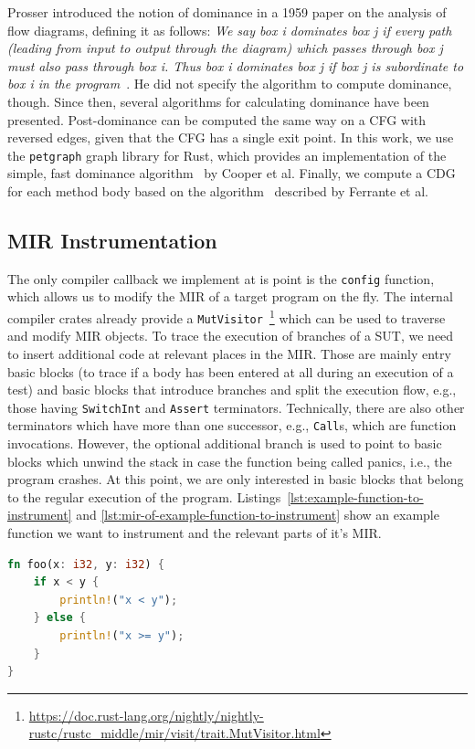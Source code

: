 \documentclass{article}
\begin{document}
Prosser introduced the notion of dominance in a 1959 paper on the analysis of flow diagrams, defining it as follows:
\textit{We say box i dominates box j if every path (leading from input to output through the diagram) which passes through box j must also pass through box i. Thus box i dominates box j if box j is subordinate to box i in the program}~\cite{Prosser1959}. He did not specify the algorithm to compute dominance, though. Since then, several algorithms for calculating dominance have been presented. Post-dominance can be computed the same way on a \ac{CFG} with reversed edges, given that the \ac{CFG} has a single exit point. In this work, we use the \lstinline{petgraph} graph library for Rust, which provides an implementation of the simple, fast dominance algorithm~\cite{Cooper2001} by Cooper et al. Finally, we compute a \ac{CDG} for each method body based on the algorithm~\cite{Ferrante1987} described by Ferrante et al.

\subsection{MIR Instrumentation}
The only compiler callback we implement at is point is the \lstinline{config} function, which allows us to modify the \ac{MIR} of a target program on the fly. The internal compiler crates already provide a \lstinline{MutVisitor}~\footnote{\url{https://doc.rust-lang.org/nightly/nightly-rustc/rustc_middle/mir/visit/trait.MutVisitor.html}} which can be used to traverse and modify \ac{MIR} objects. To trace the execution of branches of a \ac{SUT}, we need to insert additional code at relevant places in the \ac{MIR}. Those are mainly entry basic blocks (to trace if a body has been entered at all during an execution of a test) and basic blocks that introduce branches and split the execution flow, e.g., those having \lstinline{SwitchInt} and \lstinline{Assert} terminators. Technically, there are also other terminators which have more than one successor, e.g., \lstinline{Call}s, which are function invocations. However, the optional additional branch is used to point to basic blocks which unwind the stack in case the function being called panics, i.e., the program crashes. At this point, we are only interested in basic blocks that belong to the regular execution of the program. Listings~\ref{lst:example-function-to-instrument} and \ref{lst:mir-of-example-function-to-instrument} show an example function we want to instrument and the relevant parts of it's \ac{MIR}.

\begin{lstlisting}[language=Rust, style=boxed, caption={Example function to instrument}, label=lst:example-function-to-instrument]
fn foo(x: i32, y: i32) {
    if x < y {
        println!("x < y");
    } else {
        println!("x >= y");
    }
}
\end{lstlisting}
\end{document}
